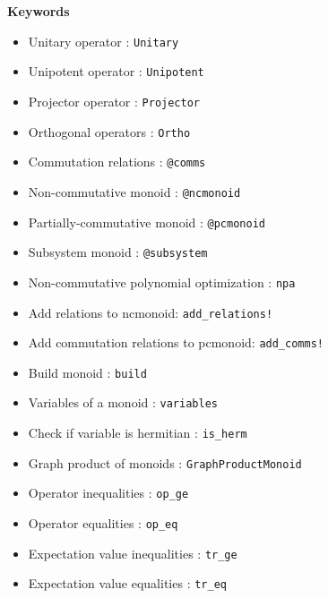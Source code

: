 \newcommand{\unitary}{\texttt{Unitary}}
\newcommand{\unipotent}{\texttt{Unipotent}}
\newcommand{\projector}{\texttt{Projector}}
\newcommand{\ortho}{\texttt{Ortho}}
\newcommand{\comms}{\texttt{@comms}}
\newcommand{\ncmonoid}{\texttt{@ncmonoid}}
\newcommand{\pcmonoid}{\texttt{@pcmonoid}}
\newcommand{\subsystem}{\texttt{@subsystem}}
\newcommand{\npa}{\texttt{npa}}
\newcommand{\addrelations}{\texttt{add\_relations!}}
\newcommand{\addcomms}{\texttt{add\_comms!}}
\newcommand{\build}{\texttt{build}}
\newcommand{\variables}{\texttt{variables}}
\newcommand{\isHerm}{\texttt{is\_herm}}
\newcommand{\graphproductmonoid}{\texttt{GraphProductMonoid}}
\newcommand{\opge}{\texttt{op\_ge}}
\newcommand{\opeq}{\texttt{op\_eq}}
\newcommand{\trge}{\texttt{tr\_ge}}
\newcommand{\treq}{\texttt{tr\_eq}}



\textbf{\Large{Keywords}}
\begin{itemize}
    \item Unitary operator : \unitary
    \item Unipotent operator : \unipotent
    \item Projector operator : \projector
    \item Orthogonal operators : \ortho
    \item Commutation relations : \comms
    \item Non-commutative monoid : \ncmonoid
    \item Partially-commutative monoid : \pcmonoid
    \item Subsystem monoid : \subsystem
    \item Non-commutative polynomial optimization : \npa
    \item Add relations to ncmonoid: \addrelations
    \item Add commutation relations to pcmonoid: \addcomms
    \item Build monoid : \build
    \item Variables of a monoid : \variables
    \item Check if variable is hermitian : \isHerm
    \item Graph product of monoids : \graphproductmonoid
    \item Operator inequalities : \opge
    \item Operator equalities : \opeq
    \item Expectation value inequalities : \trge
    \item Expectation value equalities : \treq
\end{itemize}